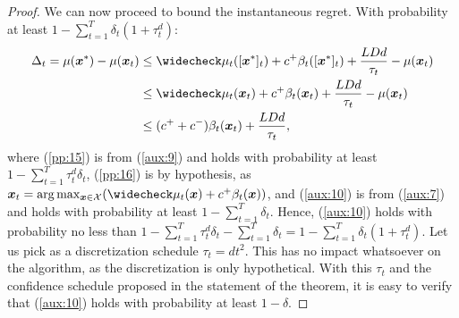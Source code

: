 \begin{proof}
	We can now proceed to bound the instantaneous regret. With probability at least $1-\sum_{t=1}^T\delta_t(1+\tau_t^d)$:
	\begin{align}
	\Delta_t = \mu(\vx^*) - \mu(\vx_t) &\leq 
	\wc{\mu_t}([\vx^*]_t) + c^{+}\beta_t([\vx^*]_t) + \frac{LDd}{\tau_t} - \mu(\vx_t) \label{pp:15}\\
	&\leq \wc{\mu_t}(\vx_t) + c^{+}\beta_t(\vx_t) + \frac{LDd}{\tau_t} - \mu(\vx_t) \label{pp:16}\\
		&\leq (c^{+}+c^{-})\beta_t(\vx_t) + \frac{LDd}{\tau_t}, \label{aux:10}
	\end{align}
	where (\ref{pp:15}) is from (\ref{aux:9}) and holds with probability at least $1-\sum_{t=1}^{T}\tau_t^d\delta_t$, (\ref{pp:16}) is by hypothesis, as $\vx_t=\arg\max_{\vx\in\Xspace}(\wc{\mu_t}(\vx) + c^{+}\beta_t(\vx))$, and (\ref{aux:10}) is from (\ref{aux:7}) and holds with probability at least $1-\sum_{t=1}^{T}\delta_t$. Hence, (\ref{aux:10}) holds with probability no less than $1-\sum_{t=1}^{T}\tau_t^d\delta_t - \sum_{t=1}^{T}\delta_t = 1 - \sum_{t=1}^T\delta_t(1+\tau_t^d)$. Let us pick as a discretization schedule $\tau_t = dt^2$. This has no impact whatsoever on the algorithm, as the discretization is only hypothetical. With this $\tau_t$ and the confidence schedule proposed in the statement of the theorem, it is easy to verify that (\ref{aux:10}) holds with probability at least $1-\delta$.
	

\end{proof}
